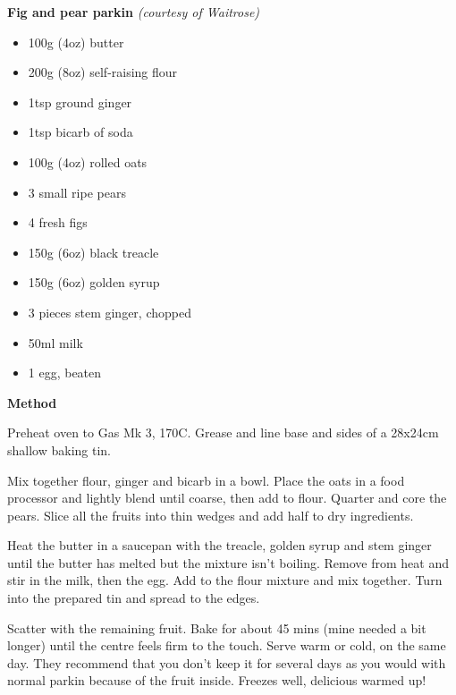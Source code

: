 \textbf{Fig and pear parkin} \emph{(courtesy of Waitrose)}

\begin{itemize}
\item 100g (4oz) butter

\item 200g (8oz) self-raising flour

\item 1tsp ground ginger

\item 1tsp bicarb of soda

\item 100g (4oz) rolled oats

\item 3 small ripe pears

\item 4 fresh figs

\item 150g (6oz) black treacle

\item 150g (6oz) golden syrup

\item 3 pieces stem ginger, chopped

\item 50ml milk

\item 1 egg, beaten

\end{itemize}

\textbf{Method}

Preheat oven to Gas Mk 3, 170C. Grease and line base and sides of a 28x24cm shallow baking tin.

Mix together flour, ginger and bicarb in a bowl. Place the oats in a food processor and lightly blend until coarse, then add to flour. Quarter and core the pears. Slice all the fruits into thin wedges and add half to dry ingredients. 

Heat the butter in a saucepan with the treacle, golden syrup and stem ginger until the butter has melted but the mixture isn't boiling. Remove from heat and stir in the milk, then the egg. Add to the flour mixture and mix together. Turn into the prepared tin and spread to the edges. 

Scatter with the remaining fruit. Bake for about 45 mins (mine needed a bit longer) until the centre feels firm to the touch. Serve warm or cold, on the same day. They recommend that you don't keep it for several days as you would with normal parkin because of the fruit inside. Freezes well, delicious warmed up! 
